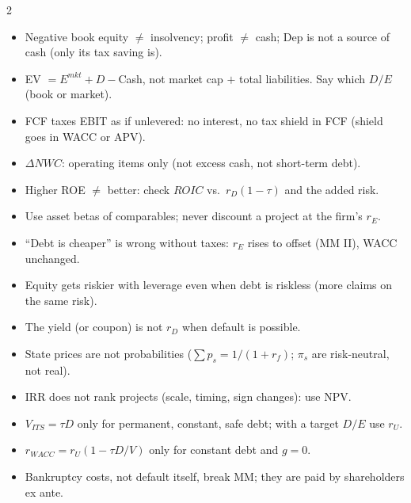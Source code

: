 \documentclass[10pt,a4paper]{extarticle}
\newcommand{\T}[1]{\par\smallskip{\color{blue!55!black}\bfseries\large #1}\par\smallskip}
\begin{document}
\begin{multicols}{2}
\T{Exam traps}
\begin{itemize}
\item Negative book equity $\ne$ insolvency; profit $\ne$ cash; Dep is not a source of cash (only its tax saving is).
\item EV $=E^{mkt}+D-$Cash, not market cap $+$ total liabilities. Say which $D/E$ (book or market).
\item FCF taxes EBIT as if unlevered: no interest, no tax shield in FCF (shield goes in WACC or APV).
\item $\Delta NWC$: operating items only (not excess cash, not short-term debt).
\item Higher ROE $\ne$ better: check $ROIC$ vs.\ $r_D(1-\tau)$ and the added risk.
\item Use asset betas of comparables; never discount a project at the firm's $r_E$.
\item ``Debt is cheaper'' is wrong without taxes: $r_E$ rises to offset (MM II), WACC unchanged.
\item Equity gets riskier with leverage even when debt is riskless (more claims on the same risk).
\item The yield (or coupon) is not $r_D$ when default is possible.
\item State prices are not probabilities ($\sum p_s=1/(1+r_f)$; $\pi_s$ are risk-neutral, not real).
\item IRR does not rank projects (scale, timing, sign changes): use NPV.
\item $V_{ITS}=\tau D$ only for permanent, constant, safe debt; with a target $D/E$ use $r_U$.
\item $r_{WACC}=r_U(1-\tau D/V)$ only for constant debt and $g=0$.
\item Bankruptcy costs, not default itself, break MM; they are paid by shareholders ex ante.
\end{itemize}

\end{multicols}
\end{document}
